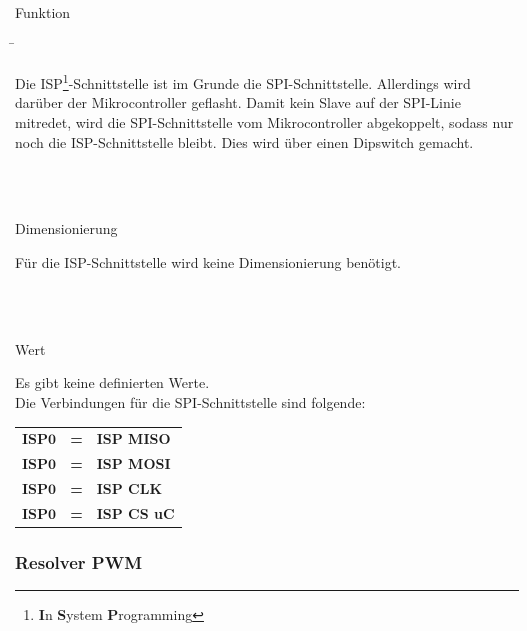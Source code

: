 \begin{tabbing}
\parbox[t]{.25\textwidth}{

Funktion

} \=\parbox[t]{.75\textwidth}{

Die ISP\footnote{\textbf{I}n \textbf{S}ystem \textbf{P}rogramming}-Schnittstelle ist im Grunde die SPI-Schnittstelle. Allerdings wird darüber der Mikrocontroller geflasht. Damit kein Slave auf der SPI-Linie mitredet, wird die SPI-Schnittstelle vom Mikrocontroller abgekoppelt, sodass nur noch die ISP-Schnittstelle bleibt. Dies wird über einen Dipswitch gemacht.


}\\
\\
\parbox[t]{.25\textwidth}{

Dimensionierung

} \>\parbox[t]{.75\textwidth}{

Für die ISP-Schnittstelle wird keine Dimensionierung benötigt.

}\\
\\
\parbox[t]{.25\textwidth}{

Wert

} \>\parbox[t]{.75\textwidth}{

Es gibt keine definierten Werte.\\

Die Verbindungen für die SPI-Schnittstelle sind folgende:

\begin{tabular}{lll}
$\mathbf{ISP0}$ & \textbf{=} &  \textbf{ISP MISO} \\
$\mathbf{ISP0}$ & \textbf{=} &  \textbf{ISP MOSI} \\
$\mathbf{ISP0}$ & \textbf{=} &  \textbf{ISP CLK} \\
$\mathbf{ISP0}$ & \textbf{=} &  \textbf{ISP CS uC} \\
\end{tabular}

}
\end{tabbing}


\subsubsection{Resolver PWM}\label{subsubsec:Resolver_PWM_Mikrocontroller}

